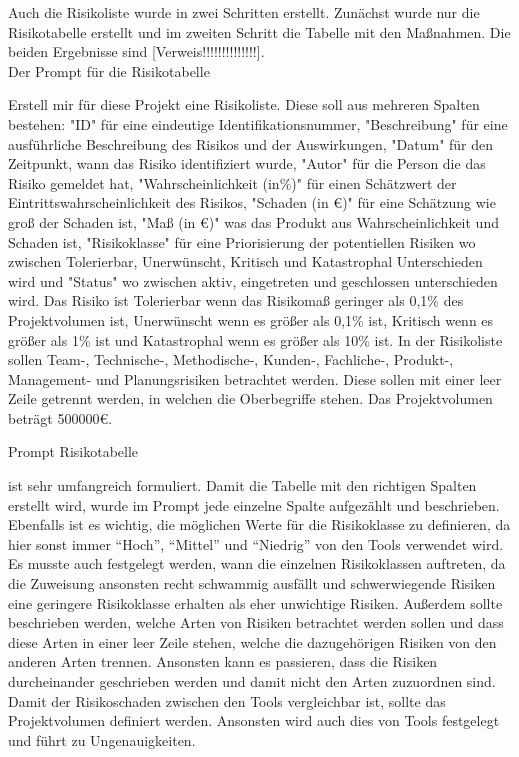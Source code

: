 Auch die Risikoliste wurde in zwei Schritten erstellt. Zunächst wurde nur die Risikotabelle erstellt und im zweiten 
Schritt die Tabelle mit den Maßnahmen. Die beiden Ergebnisse sind [Verweis!!!!!!!!!!!!!!].\\

Der Prompt für die Risikotabelle

\begin{prompt}[H]
    \begin{tcolorbox}[colback=gray!20, colframe=gray!20, boxrule=0pt, sharp corners] 
        Erstell mir für diese Projekt eine Risikoliste. Diese soll aus mehreren Spalten bestehen: "ID" für eine 
        eindeutige Identifikationsnummer, "Beschreibung" für eine ausführliche Beschreibung des Risikos und der 
        Auswirkungen, "Datum" für den Zeitpunkt, wann das Risiko identifiziert wurde, "Autor" für die Person die 
        das Risiko gemeldet hat, "Wahrscheinlichkeit (in\%)" für einen Schätzwert der Eintrittswahrscheinlichkeit 
        des Risikos, "Schaden (in €)" für eine Schätzung wie groß der Schaden ist, "Maß (in €)" was das Produkt aus 
        Wahrscheinlichkeit und Schaden ist, "Risikoklasse" für eine Priorisierung der potentiellen Risiken wo 
        zwischen Tolerierbar, Unerwünscht, Kritisch und Katastrophal Unterschieden wird und "Status" wo zwischen 
        aktiv, eingetreten und geschlossen unterschieden wird. Das Risiko ist Tolerierbar wenn das Risikomaß geringer 
        als 0,1\% des Projektvolumen ist, Unerwünscht wenn es größer als 0,1\% ist, Kritisch wenn es größer als 1\% 
        ist und Katastrophal wenn es größer als 10\% ist. In der Risikoliste sollen Team-, Technische-, Methodische-, 
        Kunden-, Fachliche-, Produkt-, Management- und Planungsrisiken betrachtet werden. Diese sollen mit einer 
        leer Zeile getrennt werden, in welchen die Oberbegriffe stehen. Das Projektvolumen beträgt 500000€.
        \vfill
    \end{tcolorbox}
    \caption{Prompt Risikotabelle}
    \label{Prompt Risikotabelle}
\end{prompt}

ist sehr umfangreich formuliert. Damit die Tabelle mit den richtigen Spalten erstellt wird, wurde im Prompt jede
einzelne Spalte aufgezählt und beschrieben. Ebenfalls ist es wichtig, die möglichen Werte für die Risikoklasse zu 
definieren, da hier sonst immer ``Hoch'', ``Mittel'' und ``Niedrig'' von den Tools verwendet wird. Es musste auch 
festgelegt werden, wann die einzelnen Risikoklassen auftreten, da die Zuweisung ansonsten recht schwammig ausfällt und
schwerwiegende Risiken eine geringere Risikoklasse erhalten als eher unwichtige Risiken. Außerdem sollte beschrieben 
werden, welche Arten von Risiken betrachtet werden sollen und dass diese Arten in einer leer Zeile stehen, welche 
die dazugehörigen Risiken von den anderen Arten trennen. Ansonsten kann es passieren, dass die Risiken durcheinander 
geschrieben werden und damit nicht den Arten zuzuordnen sind. Damit der Risikoschaden zwischen den Tools vergleichbar 
ist, sollte das Projektvolumen definiert werden. Ansonsten wird auch dies von Tools festgelegt und führt zu 
Ungenauigkeiten.\\

